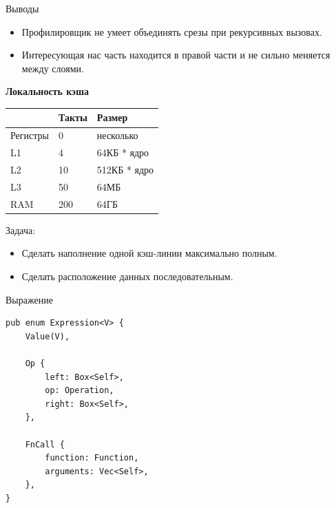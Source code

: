 \begin{frame}{Выводы}
  \begin{itemize}
    \item Профилировщик не умеет объединять срезы при рекурсивных вызовах.
    \item Интересующая нас часть находится в правой части и не сильно меняется
          между слоями.
  \end{itemize}
\end{frame}

\begin{frame}[fragile]
  \textbf{Локальность кэша}
\end{frame}

\begin{frame}
    \LARGE\begin{table}
        \begin{tabular}{|l|l|l|}
            \hline
                     & Такты & Размер       \\ \hline
            Регистры & 0     & несколько    \\ \hline
            L1       & 4     & 64КБ * ядро  \\ \hline
            L2       & 10    & 512КБ * ядро \\ \hline
            L3       & 50    & 64МБ         \\ \hline
            RAM      & 200   & 64ГБ         \\ \hline
        \end{tabular}
    \end{table}
\end{frame}

\begin{frame}{Задача:}
  \begin{itemize}
    \item Сделать наполнение одной кэш-линии максимально полным.
    \item Сделать расположение данных последовательным.
  \end{itemize}
\end{frame}

\begin{frame}[fragile]{Выражение}
    \begin{verbatim}
pub enum Expression<V> {
    Value(V),

    Op {
        left: Box<Self>,
        op: Operation,
        right: Box<Self>,
    },

    FnCall {
        function: Function,
        arguments: Vec<Self>,
    },
}
    \end{verbatim}
\end{frame}

